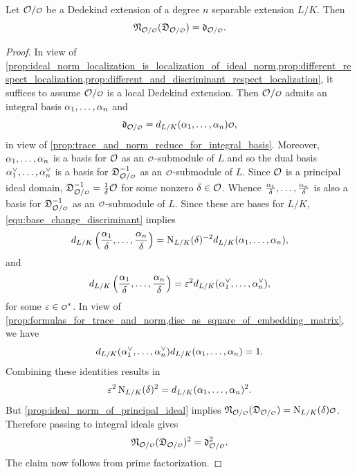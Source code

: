     \begin{proposition}\label{prop:norm_of_different_is_discriminant}
      Let \(\mc{O}/\smc{O}\) be a Dedekind extension of a degree \(n\) separable extension \(L/K\). Then
      \[
        \mf{N}_{\mc{O}/\smc{O}}(\mf{D}_{\mc{O}/\smc{O}}) = \mf{d}_{\mc{O}/\smc{O}}.
      \]
    \end{proposition}
    \begin{proof}
      In view of \cref{prop:ideal_norm_localization_is_localization_of_ideal_norm,prop:different_respect_localization,prop:different_and_discriminant_respect_localization}, it suffices to assume \(\mc{O}/\smc{O}\) is a local Dedekind extension. Then \(\mc{O}/\smc{O}\) admits an integral basis \(\alpha_{1},\ldots,\alpha_{n}\) and
      \[
        \mf{d}_{\mc{O}/\smc{O}} = d_{L/K}(\a_{1},\ldots,\a_{n})\smc{O},
      \]
      in view of \cref{prop:trace_and_norm_reduce_for_integral_basis}. Moreover, \(\alpha_{1},\ldots,\alpha_{n}\) is a basis for \(\mathcal{O}\) as an \(\smc{O}\)-submodule of \(L\) and so the dual basis \(\alpha_{1}^{\vee},\ldots,\alpha_{n}^{\vee}\) is a basis for \(\mf{D}_{\mc{O}/\smc{O}}^{-1}\) as an \(\smc{O}\)-submodule of \(L\). Since \(\mathcal{O}\) is a principal ideal domain, \(\mf{D}_{\mc{O}/\smc{O}}^{-1} = \frac{1}{\d}\mc{O}\) for some nonzero \(\delta \in \mathcal{O}\). Whence \(\frac{\alpha_{1}}{\delta},\ldots,\frac{\alpha_{n}}{\delta}\) is also a basis for \(\mf{D}_{\mc{O}/\smc{O}}^{-1}\) as an \(\smc{O}\)-submodule of \(L\). Since these are bases for \(L/K\), \cref{equ:base_change_discriminant} implies
      \[
        d_{L/K}\left(\frac{\alpha_{1}}{\delta},\ldots,\frac{\alpha_{n}}{\delta}\right) = \operatorname{\mathrm{N}}_{L/K}(\delta)^{-2}d_{L/K}(\alpha_{1},\ldots,\alpha_{n}),
      \]
      and
      \[
        d_{L/K}\left(\frac{\alpha_{1}}{\delta},\ldots,\frac{\alpha_{n}}{\delta}\right) = \varepsilon^{2}d_{L/K}(\alpha_{1}^{\vee},\ldots,\alpha_{n}^{\vee}),
      \]
      for some \(\e \in \smc{O}^{\ast}\). In view of \cref{prop:formulas_for_trace_and_norm,disc_as_square_of_embedding_matrix}, we have
      \[
        d_{L/K}(\alpha_{1}^{\vee},\ldots,\alpha_{n}^{\vee})d_{L/K}(\alpha_{1},\ldots,\alpha_{n}) = 1.
      \]
      Combining these identities results in
      \[
        \varepsilon^{2}\operatorname{\mathrm{N}}_{L/K}(\delta)^{2} = d_{L/K}(\alpha_{1},\ldots,\alpha_{n})^{2}.
      \]
      But \cref{prop:ideal_norm_of_principal_ideal} implies \(\mf{N}_{\mc{O}/\smc{O}}(\mf{D}_{\mc{O}/\smc{O}}) = \Norm_{L/K}(\d)\smc{O}\). Therefore passing to integral ideals gives
      \[
        \mf{N}_{\mc{O}/\smc{O}}(\mf{D}_{\mc{O}/\smc{O}})^{2} = \mf{d}_{\mc{O}/\smc{O}}^{2}.
      \]
      The claim now follows from prime factorization.
    \end{proof}

